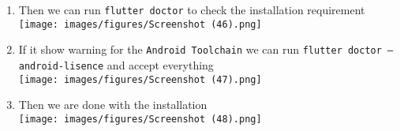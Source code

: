 \documentclass[12pt,titlepage]{article}
\begin{document}
\begin{enumerate}
    \item Then we can run \texttt{flutter doctor} to check the installation requirement \\ \texttt{[image: images/figures/Screenshot (46).png]}
    \newpage
    \item If it show warning for the \texttt{Android Toolchain} we can run \texttt{flutter doctor --android-lisence} and accept everything \\ \texttt{[image: images/figures/Screenshot (47).png]}
    \item Then we are done with the installation \\ \texttt{[image: images/figures/Screenshot (48).png]}
\end{enumerate}
\end{document}
